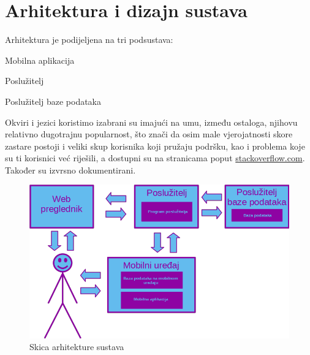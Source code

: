 \chapter{Arhitektura i dizajn sustava}

		Arhitektura je podijeljena na tri podsustava:
    \begin{packed_item}
        \item Mobilna aplikacija
        \item Poslužitelj
        \item Poslužitelj baze podataka
    \end{packed_item}
    
    Okviri i jezici koristimo izabrani su imajući na umu, između ostaloga, njihovu relativno dugotrajnu popularnost, što znači da osim male vjerojatnosti skore zastare postoji i veliki skup korisnika koji pružaju podršku, kao i problema koje su ti korisnici već riješili, a dostupni su na stranicama poput \url{stackoverflow.com}. Također su izvrsno dokumentirani. \\
    
	    \begin{figure}[H]
	        \begin{center}
            \includegraphics[width=1.0\linewidth]{slike/arh_skica.png}
            \caption{Skica arhitekture sustava}
            \label{fig:arh_skica}
            \end{center}
        \end{figure}
        
